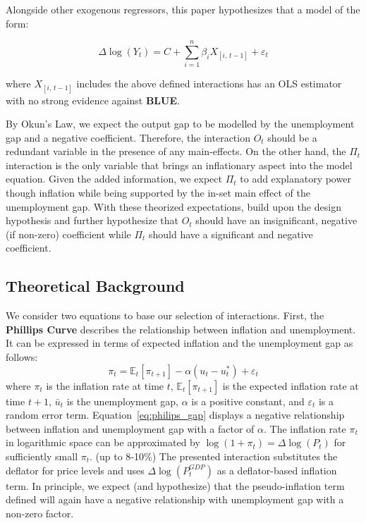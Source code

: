 \noindent Alongside other exogenous regressors, this paper hypothesizes that a model of the form:

\begin{equation}
    \label{eq:model_eq}
   \Delta \log(Y_t) = C + \sum_{i=1}^n \beta_i X_{[i, \, t-1]} + \varepsilon_t
\end{equation}

\noindent where $X_{[i, \, t-1]}$ includes the above defined interactions has an OLS estimator with no strong evidence against \textbf{BLUE}.

\vspace{\baselineskip}
By Okun's Law, we expect the output gap to be modelled by the unemployment gap and a negative coefficient.
Therefore, the interaction $O_t$ should be a redundant variable in the presence of any main-effects.
On the other hand, the $\Pi_t$ interaction is the only variable that brings an inflationary aspect into the model equation.
Given the added information, we expect $\Pi_t$ to add explanatory power though inflation while being supported by the in-set main effect of the unemployment gap.
With these theorized expectations, build upon the design hypothesis and further hypothesize that $O_t$ should have an insignificant, negative (if non-zero) coefficient while $\Pi_t$ should have a significant and negative coefficient.


\subsection{Theoretical Background}\label{subsec:theory}
We consider two equations to base our selection of interactions.
First, the \textbf{Phillips Curve} describes the relationship between inflation and unemployment.
It can be expressed in terms of expected inflation and the unemployment gap as follows:
\begin{equation}
    \pi_t = \mathbb{E}_t[\pi_{t+1}] - \alpha (u_t - u_t^*) + \varepsilon_t
    \label{eq:philips_gap}
\end{equation}
where $\pi_t$ is the inflation rate at time $t$, $\mathbb{E}_t[\pi_{t+1}]$ is the expected inflation rate at time $t+1$, $\bar{u}_t$ is the unemployment gap, $\alpha$ is a positive constant, and $\varepsilon_t$ is a random error term.
Equation~\ref{eq:philips_gap} displays a negative relationship between inflation and unemployment gap with a factor of $\alpha$.
The inflation rate $\pi_t$ in logarithmic space can be approximated by $\log(1 + \pi_t) = \Delta\log(P_t)$ for sufficiently small $\pi_t$. (up to 8-10\%)
The presented interaction substitutes the deflator for price levels and uses $\Delta\log(P_t^{GDP})$ as a deflator-based inflation term.
In principle, we expect (and hypothesize) that the pseudo-inflation term defined will again have a negative relationship with unemployment gap with a non-zero factor.

